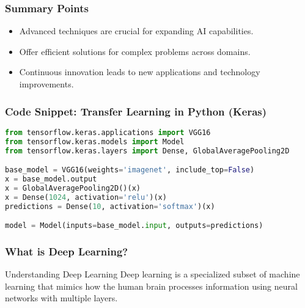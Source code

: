 \documentclass[aspectratio=169]{beamer}
\begin{document}
\begin{frame}[fragile]
    \frametitle{Summary Points}
    \begin{itemize}
        \item Advanced techniques are crucial for expanding AI capabilities.
        \item Offer efficient solutions for complex problems across domains.
        \item Continuous innovation leads to new applications and technology improvements.
    \end{itemize}
\end{frame}

\begin{frame}[fragile]
    \frametitle{Code Snippet: Transfer Learning in Python (Keras)}
    \begin{lstlisting}[language=Python]
from tensorflow.keras.applications import VGG16
from tensorflow.keras.models import Model
from tensorflow.keras.layers import Dense, GlobalAveragePooling2D

base_model = VGG16(weights='imagenet', include_top=False)
x = base_model.output
x = GlobalAveragePooling2D()(x)
x = Dense(1024, activation='relu')(x)
predictions = Dense(10, activation='softmax')(x)

model = Model(inputs=base_model.input, outputs=predictions)
    \end{lstlisting}
\end{frame}

\begin{frame}[fragile]
    \frametitle{What is Deep Learning?}
    \begin{block}{Understanding Deep Learning}
        Deep learning is a specialized subset of machine learning that mimics how the human brain processes information using neural networks with multiple layers.
    \end{block}
\end{frame}
\end{document}
